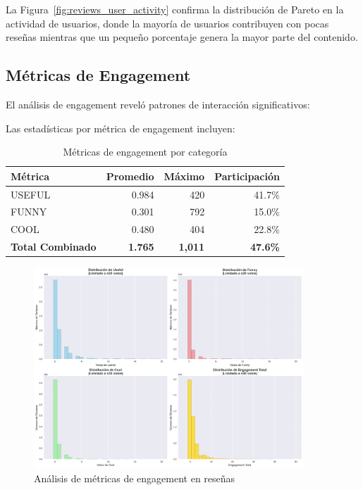\documentclass[12pt,a4paper,twoside,openany]{book}
\begin{document}
La Figura~\ref{fig:reviews_user_activity} confirma la distribución de Pareto en la actividad de usuarios, donde la mayoría de usuarios contribuyen con pocas reseñas mientras que un pequeño porcentaje genera la mayor parte del contenido.

\subsection{Métricas de Engagement}

El análisis de engagement reveló patrones de interacción significativos:

Las estadísticas por métrica de engagement incluyen:

\begin{table}[H]
\centering
\caption{Métricas de engagement por categoría}
\begin{tabular}{@{}lrrr@{}}
\toprule
\textbf{Métrica} & \textbf{Promedio} & \textbf{Máximo} & \textbf{Participación} \\
\midrule
USEFUL & 0.984 & 420 & 41.7\% \\
FUNNY & 0.301 & 792 & 15.0\% \\
COOL & 0.480 & 404 & 22.8\% \\
\textbf{Total Combinado} & \textbf{1.765} & \textbf{1,011} & \textbf{47.6\%} \\
\bottomrule
\end{tabular}
\end{table}

\begin{figure}[H]
\centering
\includegraphics[width=0.9\textwidth]{figures/reviews_engagement_analysis.png}
\caption{Análisis de métricas de engagement en reseñas}
\label{fig:reviews_engagement}
\end{figure}
\end{document}

